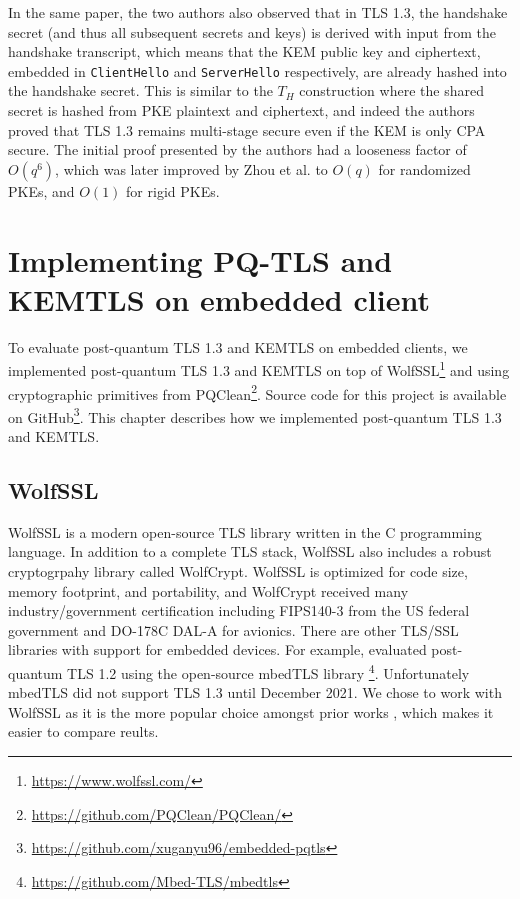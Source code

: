 \documentclass[letterpaper,12pt,titlepage,oneside,final]{book}
\begin{document}
In the same paper, the two authors also observed that in TLS 1.3, the handshake secret (and thus all subsequent secrets and keys) is derived with input from the handshake transcript, which means that the KEM public key and ciphertext, embedded in \texttt{ClientHello} and \texttt{ServerHello} respectively, are already hashed into the handshake secret.
This is similar to the $T_H$ construction where the shared secret is hashed from PKE plaintext and ciphertext, and indeed the authors proved that TLS 1.3 remains multi-stage secure even if the KEM is only CPA secure.
The initial proof presented by the authors had a looseness factor of $O(q^6)$, which was later improved by Zhou et al.\cite{DBLP:conf/asiacrypt/ZhouJZ24} to $O(q)$ for randomized PKEs, and $O(1)$ for rigid PKEs.

\chapter{Implementing PQ-TLS and KEMTLS on embedded client}\label{sec:implementing-pqtls-and-kemtls}
To evaluate post-quantum TLS 1.3 and KEMTLS on embedded clients, we implemented post-quantum TLS 1.3 and KEMTLS on top of WolfSSL\footnote{\scriptsize \url{https://www.wolfssl.com/}} and using cryptographic primitives from PQClean\footnote{\scriptsize \url{https://github.com/PQClean/PQClean/}}\cite{DBLP:conf/eurosp/KannwischerSSW22}. Source code for this project is available on GitHub\footnote{\scriptsize \url{https://github.com/xuganyu96/embedded-pqtls}}. This chapter describes how we implemented post-quantum TLS 1.3 and KEMTLS.

\section{WolfSSL}\label{sec:wolfssl}
WolfSSL is a modern open-source TLS library written in the C programming language. 
In addition to a complete TLS stack, WolfSSL also includes a robust cryptogrpahy library called WolfCrypt.
WolfSSL is optimized for code size, memory footprint, and portability, and WolfCrypt received many industry/government certification including FIPS140-3 from the US federal government and DO-178C DAL-A for avionics.
There are other TLS/SSL libraries with support for embedded devices. 
For example, \cite{DBLP:conf/ccs/Burstinghaus-Steinbach20} evaluated post-quantum TLS 1.2 using the open-source mbedTLS library \footnote{\scriptsize \url{https://github.com/Mbed-TLS/mbedtls}}. Unfortunately mbedTLS did not support TLS 1.3 until December 2021.
We chose to work with WolfSSL as it is the more popular choice amongst prior works \cite{DBLP:conf/ispec/GeorgeLFZSS22,cryptoeprint:2021/1553,DBLP:journals/iacr/GeorgeLFZSS21,DBLP:conf/space/GonzalezW22}, which makes it easier to compare reults.
\end{document}
